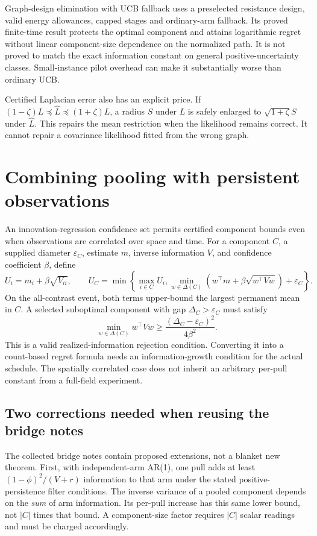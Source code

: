 Graph-design elimination with UCB fallback uses a preselected resistance design, valid energy allowances, capped stages and ordinary-arm fallback. Its proved finite-time result protects the optimal component and attains logarithmic regret without linear component-size dependence on the normalized path. It is not proved to match the exact information constant on general positive-uncertainty classes. Small-instance pilot overhead can make it substantially worse than ordinary UCB.

Certified Laplacian error also has an explicit price. If $(1-\zeta)L\preceq\widehat L\preceq(1+\zeta)L$, a radius $S$ under $L$ is safely enlarged to $\sqrt{1+\zeta}S$ under $\widehat L$. This repairs the mean restriction when the likelihood remains correct. It cannot repair a covariance likelihood fitted from the wrong graph.

\section{Combining pooling with persistent observations}

An innovation-regression confidence set permits certified component bounds even when observations are correlated over space and time. For a component $C$, a supplied diameter $\varepsilon_C$, estimate $m$, inverse information $V$, and confidence coefficient $\beta$, define
\begin{equation}
U_i=m_i+\beta\sqrt{V_{ii}},\qquad
U_C=\min\left\{\max_{i\in C}U_i,
\min_{w\in\Delta(C)}(w^\top m+\beta\sqrt{w^\top Vw})+\varepsilon_C\right\}.
\end{equation}
On the all-contrast event, both terms upper-bound the largest permanent mean in $C$. A selected suboptimal component with gap $\Delta_C>\varepsilon_C$ must satisfy
\begin{equation}
\min_{w\in\Delta(C)}w^\top Vw
\ge\frac{(\Delta_C-\varepsilon_C)^2}{4\beta^2}.
\end{equation}
This is a valid realized-information rejection condition. Converting it into a count-based regret formula needs an information-growth condition for the actual schedule. The spatially correlated case does not inherit an arbitrary per-pull constant from a full-field experiment.

\subsection{Two corrections needed when reusing the bridge notes}
The collected bridge notes contain proposed extensions, not a blanket new theorem. First, with independent-arm AR(1), one pull adds at least $(1-\phi)^2/(V+r)$ information to that arm under the stated positive-persistence filter conditions. The inverse variance of a pooled component depends on the \emph{sum} of arm information. Its per-pull increase has this same lower bound, not $|C|$ times that bound. A component-size factor requires $|C|$ scalar readings and must be charged accordingly.

